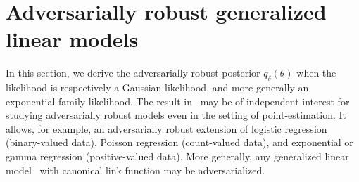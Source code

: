 \section{Adversarially robust generalized linear models}
\label{sec:adversarially-robust-posterior}

In this section, we derive the adversarially robust posterior $q_\delta(\theta)$ when the likelihood is respectively a Gaussian likelihood, and more generally an exponential family likelihood.
The result in~ may be of independent interest for studying adversarially robust models even in the setting of point-estimation.
It allows, for example, an adversarially robust extension of  logistic regression (binary-valued data), Poisson regression (count-valued data), and exponential or gamma regression (positive-valued data).
More generally, any generalized linear model~\citep{mccullagh1989generalized} with canonical link function may be adversarialized. 

